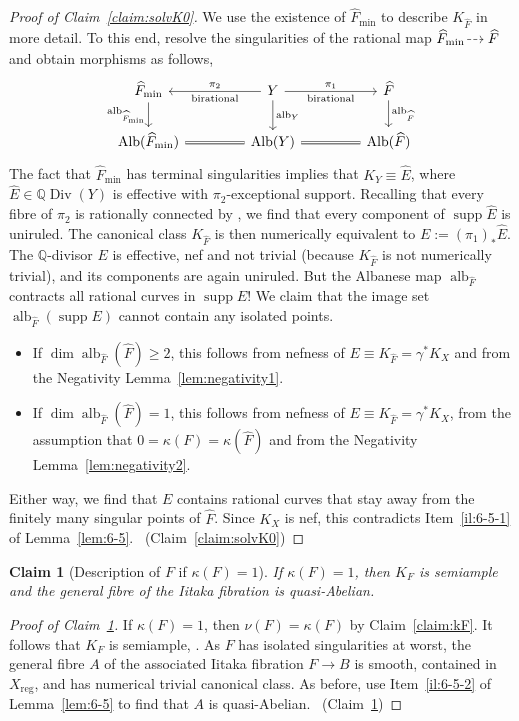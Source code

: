 \documentclass[JEP,XML,SOM,Unicode,published]{cedram}
\let\vref\ref
\let\ts\relax
\newcommand{\dradpl}{{\hspace*{-2.5mm}\begin{tikzcd}[ampersand replacement=\&,column sep = scriptsize]\mbox{}\ar[r,dashed]\&\mbox{}\end{tikzcd}\hspace*{-2.5mm}}}
\newcommand{\dratst}{{\hspace*{-2.5mm}\begin{tikzcd}[ampersand replacement=\&,column sep = small]\mbox{}\ar[r,dashed]\&\mbox{}\end{tikzcd}\hspace*{-2mm}}}
\let\drascst\dratst
\newcommand{\dra}{\mathchoice{\dradpl}{\dratst}{\drascst}{\drascst}}
\let\dasharrow\dra
\theoremstyle{plain}
\newtheorem{claim}[thm]{Claim}
\theoremstyle{definition}
\numberwithin{equation}{thm}
\numberwithin{enumi}{thm}
\newcommand{\reg}{\mathrm{reg}}
\DeclareMathOperator{\supp}{supp}
\DeclareMathOperator{\alb}{alb}
\DeclareMathOperator{\Alb}{Alb}
\DeclareMathOperator{\Div}{Div}
\newcommand{\bQ}{\mathbb{Q}}
\let\what\widehat
\begin{document}
\begin{proof}[Proof of Claim~\ref{claim:solvK0}]
We use the existence of $\what{F}_{\min}$ to describe $K_{\what{F}}$ in more
detail. To this end, resolve the singularities of the rational map
$\what{F}_{\min} \dasharrow \what{F}$ and obtain morphisms as follows,
\[
\begin{tikzcd}[column sep=1.5cm]
\what{F}_{\min} \ar[d, "\ts\alb_{\what{F}_{\min}}"'] & Y \ar[r, "\ts\pi_1", "\ts\text{birational}"'] \ar[l, "\ts\pi_2"', "\ts\text{birational}"] \ar[d, "\ts\alb_{Y}"] & \what{F} \ar[d, "\ts\alb_{\what{F}}"] \\
\Alb(\what{F}_{\min}) \ar[r, equal] & \Alb(Y) \ar[r, equal] & \Alb(\what{F})
\end{tikzcd}
\]
The fact that $\what{F}_{\min}$ has terminal singularities implies that
$K_Y \equiv \what{E}$, where $\what E \in \bQ\Div(Y)$ is effective with
$\pi_2$-exceptional support. Recalling that every fibre of $\pi_2$ is rationally
connected by \cite[Cor.\,1.5]{HMcK07}, we find that every component of
$\supp \what{E}$ is uniruled. The canonical class $K_{\what{F}}$ is then
numerically equivalent to $E := (\pi_1)_*\what{E}$. The $\bQ$-divisor $E$ is
effective, nef and not trivial (because $K_{\what{F}}$ is not numerically
trivial), and its components are again uniruled. But the Albanese map
$\alb_{\what{F}}$ contracts all rational curves in $\supp E$! We claim that
the image set $\alb_{\what{F}}(\supp E)$ cannot contain any isolated points.
\begin{itemize}
\item If $\dim \alb_{\what{F}}(\what{F}) \geq 2$, this follows from nefness of
$E \equiv K_{\what{F}} = \gamma^* K_X$ and from the Negativity
Lemma~\vref{lem:negativity1}.

\item If $\dim \alb_{\what{F}}(\what{F}) = 1$, this follows from nefness of
$E \equiv K_{\what{F}} = \gamma^* K_X$, from the assumption that
$0 = \kappa(F) = \kappa(\what{F})$ and from the Negativity
Lemma~\vref{lem:negativity2}.
\end{itemize}
Either way, we find that $E$ contains rational curves that stay away from the
finitely many singular points of $\what{F}$. Since $K_X$ is nef, this
contradicts Item~\ref{il:6-5-1} of Lemma~\ref{lem:6-5}.
\qedhere~\mbox{(Claim~\ref{claim:solvK0})}
\end{proof}

\begin{claim}[Description of $F$ if $\kappa(F)=1$]\label{claim:solvK1}
If $\kappa(F)=1$, then $K_F$ is semiample and the general fibre of the Iitaka
fibration is quasi-Abelian.
\end{claim}
\begin{proof}[Proof of Claim~\ref{claim:solvK1}]
If $\kappa(F)=1$, then $\nu(F) = \kappa(F)$ by Claim~\ref{claim:kF}. It follows that
$K_F$ is semiample, \cite[Cor.\,6-1-13]{KMM87}. As $F$ has isolated
singularities at worst, the general fibre $A$ of the associated Iitaka
fibration $F \to B$ is smooth, contained in $X_{\reg}$, and has numerical
trivial canonical class. As before, use Item~\ref{il:6-5-2} of
Lemma~\ref{lem:6-5} to find that $A$ is quasi-Abelian.
\qedhere~\mbox{(Claim~\ref{claim:solvK1})}
\end{proof}
\end{document}
